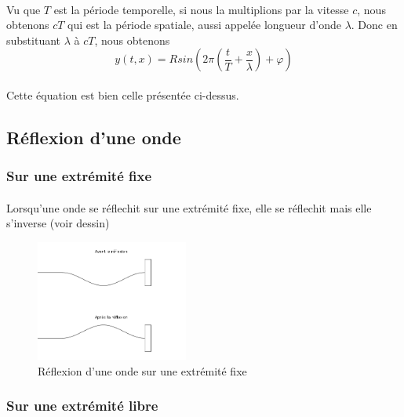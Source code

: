 \documentclass[a4paper]{article}
\begin{document}
\paragraph{}Vu que $T$ est la période temporelle, si nous la multiplions par la vitesse $c$, nous obtenons $cT$ qui est la période spatiale, aussi appelée longueur d'onde $\lambda$. Donc en substituant $\lambda$ à $cT$, nous obtenons
\[y(t,x)=Rsin\left(2\pi \left(\frac{t}{T}+\frac{x}{\lambda}\right)+\varphi\right)\]
\paragraph{}Cette équation est bien celle présentée ci-dessus.
\subsection{Réflexion d'une onde}
\subsubsection{Sur une extrémité fixe}
\paragraph{}Lorsqu'une onde se réflechit sur une extrémité fixe, elle se réflechit mais elle s'inverse (voir dessin)
\begin{figure}
\begin{center}
\includegraphics[width=5cm]{imgs/reflfixe.png}
\end{center}
\caption{Réflexion d'une onde sur une extrémité fixe}
\label{Réflexion d'une onde sur une extrémité fixe}
\end{figure}
\subsubsection{Sur une extrémité libre}
\end{document}
